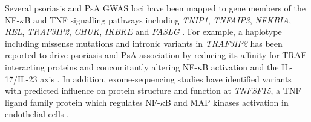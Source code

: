 Several psoriasis and PsA GWAS loci have been mapped to gene members of the NF-$\kappa$B and TNF signalling pathways including \textit{TNIP1}, \textit{TNFAIP3}, \textit{NFKBIA}, \textit{REL}, \textit{TRAF3IP2}, \textit{CHUK}, \textit{IKBKE} and \textit{FASLG} \parencite{Nair2008, Ellinghaus2010, Huffmeier2010, Wang2008, Idel2003, Bowes2012, Tsoi2017}. 
For example, a haplotype including missense mutations and intronic variants in \textit{TRAF3IP2} has been reported to drive psoriasis and PsA association by reducing its affinity for TRAF interacting proteins and concomitantly altering NF-$\kappa$B activation and the IL-17/IL-23 axis \parencite{Huffmeier2010, Ellinghaus2010}. In addition, exome-sequencing studies have identified variants with predicted influence on protein structure and function at \textit{TNFSF15}, a TNF ligand family protein which regulates NF-$\kappa$B and MAP kinases activation in endothelial cells \parencite{Dand2017, Wang2014}.





